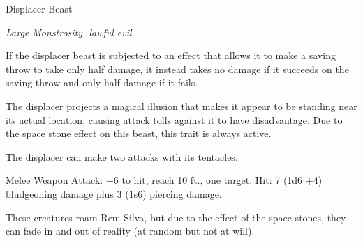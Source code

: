 \documentclass[letterpaper,10pt,twoside,twocolumn,openany]{book}
\begin{document}
\begin{monsterbox}{Displacer Beast}
	\begin{hangingpar}
		\textit{Large Monstrosity, lawful evil}
	\end{hangingpar}
	\dndline%
	\basics[%
	armorclass = 13,
	hitpoints  = 85,
	speed      = 40 ft
	]
	\dndline%
	\stats[
	STR = \stat{18}, %
	DEX = \stat{15},
	CON = \stat{16},
	INT = \stat{6},
	WIS = \stat{12},
	CHA = \stat{8}
	]
	\dndline%
	\details[%
	senses = {darkvision 60 ft., passive perception 11},
	challenge = 3 (700XP)
	]
	\dndline%
	\begin{monsteraction}[Avoidance]
		If the displacer beast is subjected to an effect that allows it to make a saving throw to take only half damage, it instead takes no damage if it succeeds on the saving throw and only half damage if it fails.
	\end{monsteraction}	
	\begin{monsteraction}[Displacement]
		The displacer projects a magical illusion that makes it appear to be standing near its actual location, causing attack tolls against it to have disadvantage. Due to the space stone effect on this beast, this trait is always active.
	\end{monsteraction}	
	\begin{monsteraction}[Multiattack]
		The displacer can make two attacks with its tentacles. 
	\end{monsteraction}
	\begin{monsteraction}[Tentacle]
		Melee Weapon Attack: +6 to hit, reach 10 ft., one target. Hit: 7 (1d6 +4) bludgeoning damage plus 3 (1s6) piercing damage.
	\end{monsteraction}	
	These creatures roam Rem Silva, but due to the effect of the space stones, they can fade in and out of reality (at random but not at will).
\end{monsterbox}
\end{document}
